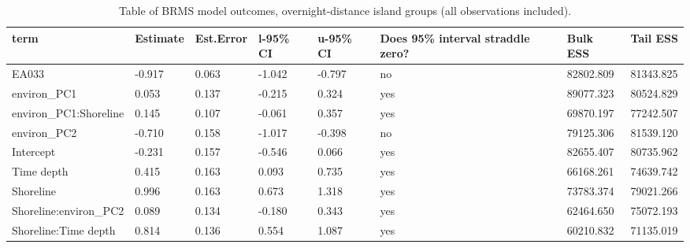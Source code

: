 \begin{table}[ht]
\centering
\begin{tabular}{p{5cm}p{2cm}p{2cm}p{2cm}p{2cm}p{2cm}p{2cm}p{2cm}}
  \toprule
term & Estimate & Est.Error & l-95\% CI & u-95\% CI & Does 95\% interval straddle zero? & Bulk ESS & Tail ESS \\ 
  \midrule
EA033 & -0.917 & 0.063 & -1.042 & -0.797 & no & 82802.809 & 81343.825 \\ 
  environ\_PC1 & 0.053 & 0.137 & -0.215 & 0.324 & yes & 89077.323 & 80524.829 \\ 
  environ\_PC1:Shoreline & 0.145 & 0.107 & -0.061 & 0.357 & yes & 69870.197 & 77242.507 \\ 
  environ\_PC2 & -0.710 & 0.158 & -1.017 & -0.398 & no & 79125.306 & 81539.120 \\ 
  Intercept & -0.231 & 0.157 & -0.546 & 0.066 & yes & 82655.407 & 80735.962 \\ 
  Time depth & 0.415 & 0.163 & 0.093 & 0.735 & yes & 66168.261 & 74639.742 \\ 
  Shoreline & 0.996 & 0.163 & 0.673 & 1.318 & yes & 73783.374 & 79021.266 \\ 
  Shoreline:environ\_PC2 & 0.089 & 0.134 & -0.180 & 0.343 & yes & 62464.650 & 75072.193 \\ 
  Shoreline:Time depth & 0.814 & 0.136 & 0.554 & 1.087 & yes & 60210.832 & 71135.019 \\ 
   \bottomrule
\end{tabular}
\caption{Table of BRMS model outcomes, overnight-distance island groups (all observations included).} 
\label{BRMS_effects_SBZR}
\end{table}

